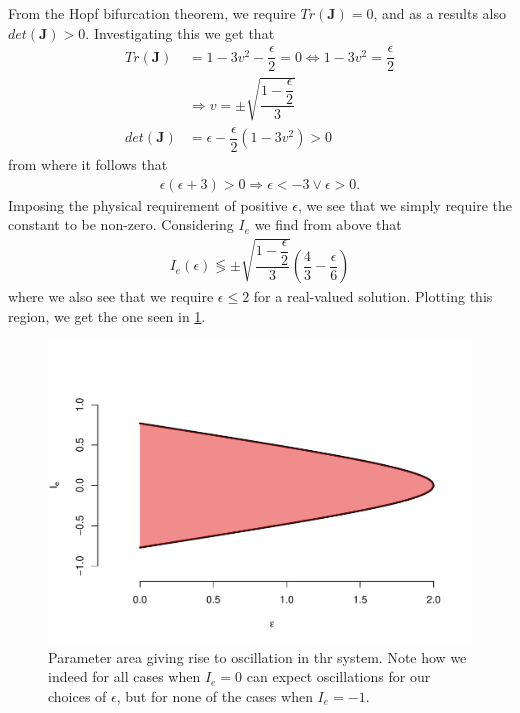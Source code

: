\documentclass[10pt]{article}\usepackage[]{graphicx}\usepackage[]{color}
\makeatletter
\def\maxwidth{ %
  \ifdim\Gin@nat@width>\linewidth
    \linewidth
  \else
    \Gin@nat@width
  \fi
}
\newcommand{\matr}[1]{\mathbf{#1}}
\theoremstyle{plain}
\makeatother
\begin{document}
\begin{multicols*}{2}
	From the Hopf bifurcation theorem, we require $Tr(\matr J) = 0$, and as a results also $det(\matr J) > 0$. Investigating this we get that 
	\begin{align}
	  Tr(\matr J) &= 1-3v^2 - \dfrac{\epsilon}{2} = 0 \Leftrightarrow 1 - 3v^2 = \dfrac{\epsilon}{2} \\
	  &\Rightarrow v = \pm \sqrt{\dfrac{1 - \dfrac{\epsilon}{2}}{3}} \\
	  det(\matr J) &= \epsilon - \dfrac{\epsilon}{2}(1-3v^2) > 0 
	\end{align}
	from where it follows that 
	\begin{align}
	  \epsilon (\epsilon + 3) > 0 \Rightarrow \epsilon < -3 \lor \epsilon > 0.
	\end{align}
	Imposing the physical requirement of positive $\epsilon$, we see that we simply require the constant to be non-zero. Considering $I_e$ we find from above that 
	\begin{align}
	  I_e (\epsilon) \lessgtr \pm \sqrt{\dfrac{1 - \dfrac{\epsilon}{2}}{3}}\left( \dfrac{4}{3} - \dfrac{\epsilon}{6} \right)
	\end{align}
	where we also see that we require $\epsilon \leq 2$ for a real-valued solution.
	Plotting this region, we get the one seen in \cref{fig:Ie}.
	
\begin{Schunk}
\begin{figure}[H]

{\centering \includegraphics[width=\maxwidth]{../figures/twocolumn-Ie-1} 

}

\caption[Parameter area giving rise to oscillation in thr system]{Parameter area giving rise to oscillation in thr system. Note how we indeed for all cases when $I_e = 0$ can expect oscillations for our choices of $\epsilon$, but for none of the cases when $I_e = -1$.}\label{fig:Ie}
\end{figure}
\end{Schunk}
	

\end{multicols*}
\end{document}

